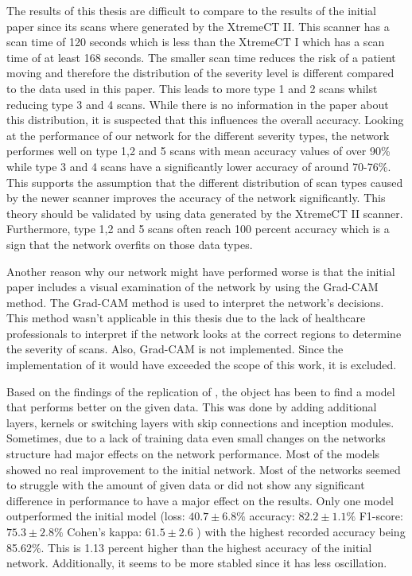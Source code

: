 \documentclass[
a4paper, 
12pt,
grayscalebody, %
abstract=on,
twoside, BCOR10mm, 12pt, DIV13,headinclude, footexclude, final, abstracton, openright
]{ibireprt}
\numberwithin{equation}{chapter}
\numberwithin{table}{chapter}
\numberwithin{figure}{chapter}
\numberwithin{algorithm}{chapter}
\numberwithin{example}{chapter}
\numberwithin{example}{chapter}
\begin{document}
The results of this thesis are difficult to compare to the results of the initial paper since its scans where generated by the XtremeCT II. \citet{Walle2023} This scanner has a scan time of 120 seconds which is less than the XtremeCT I which has a scan time of at least 168 seconds. \citet{Tran2019} The smaller scan time reduces the risk of a patient moving and therefore the distribution of the severity level is different compared to the data used in this paper. This leads to more type 1 and 2 scans whilst reducing type 3 and 4 scans. While there is no information in the paper \citet{Walle2023} about this distribution, it is suspected that this influences the overall accuracy. Looking at the performance of our network for the different severity types, the network performes well on type 1,2 and 5 scans with mean accuracy values of over 90\% while type 3 and 4 scans have a significantly lower accuracy of around 70-76\%. This supports the assumption that the different distribution of scan types caused by the newer scanner improves the accuracy of the network significantly. This theory should be validated by using data generated by the XtremeCT II scanner. Furthermore, type 1,2 and 5 scans often reach 100 percent accuracy which is a sign that the network overfits on those data types. 

Another reason why our network might have performed worse is that the initial paper includes a visual examination of the network by using the Grad-CAM method. The Grad-CAM method is used to interpret the network's decisions. This method wasn't applicable in this thesis due to the lack of healthcare professionals to interpret if the network looks at the correct regions to determine the severity of scans. Also, Grad-CAM is not implemented. Since the implementation of it would have exceeded the scope of this work, it is excluded. 

Based on the findings of the replication of \citet{Walle2023}, the object has been to find a model that performs better on the given data. This was done by adding additional layers, kernels or switching layers with skip connections and inception modules. Sometimes, due to a lack of training data even small changes on the networks structure had major effects on the network performance. Most of the models showed no real improvement to the initial network. Most of the networks seemed to struggle with the amount of given data or did not show any significant difference in performance to have a major effect on the results. Only one model outperformed the initial model (loss: $40.7\pm6.8\% $ accuracy: $82.2\pm1.1\%$ F1-score: $75.3\pm2.8\%$  Cohen's kappa: $61.5\pm2.6$ ) with the highest recorded accuracy being 85.62\%. This is 1.13 percent higher than the highest accuracy of the initial network. Additionally, it seems to be more stabled since it has less oscillation. 
\end{document}
